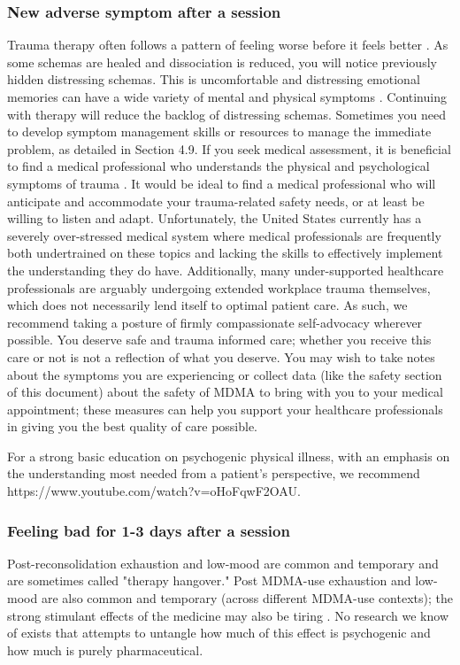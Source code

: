 \documentclass[12pt,letterpaper]{article}
\begin{document}
\subsubsection{New adverse symptom after a session}
Trauma therapy often follows a pattern of feeling worse before it feels better \cite{vanderKolkBody}. As some schemas are healed and dissociation is reduced, you will notice previously hidden distressing schemas. This is uncomfortable and distressing emotional memories can have a wide variety of mental and physical symptoms \cite{kroenkeSomatic,henningsenSomatic}. Continuing with therapy will reduce the backlog of distressing schemas. Sometimes you need to develop symptom management skills or resources to manage the immediate problem, as detailed in Section 4.9. If you seek medical assessment, it is beneficial to find a medical professional who understands the physical and psychological symptoms of trauma \todo{[107]}. It would be ideal to find a medical professional who will anticipate and accommodate your trauma-related safety needs, or at least be willing to listen and adapt. Unfortunately, the United States currently has a severely over-stressed medical system where medical professionals are frequently both undertrained on these topics and lacking the skills to effectively implement the understanding they do have. Additionally, many under-supported healthcare professionals are arguably undergoing extended workplace trauma themselves, which does not necessarily lend itself to optimal patient care. As such, we recommend taking a posture of firmly compassionate self-advocacy wherever possible. You deserve safe and trauma informed care; whether you receive this care or not is not a reflection of what you deserve. You may wish to take notes about the symptoms you are experiencing or collect data (like the safety section of this document) about the safety of MDMA to bring with you to your medical appointment; these measures can help you support your healthcare professionals in giving you the best quality of care possible. 

For a strong basic education on psychogenic physical illness, with an emphasis on the understanding most needed from a patient's perspective, we recommend https://www.youtube.com/watch?v=oHoFqwF2OAU. 
\subsubsection{Feeling bad for 1-3 days after a session}
Post-reconsolidation exhaustion and low-mood are common and temporary and are sometimes called "therapy hangover." Post MDMA-use exhaustion and low-mood are also common and temporary (across different MDMA-use contexts); the strong stimulant effects of the medicine may also be tiring . No research we know of exists that attempts to untangle how much of this effect is psychogenic and how much is purely pharmaceutical. 
\end{document}

